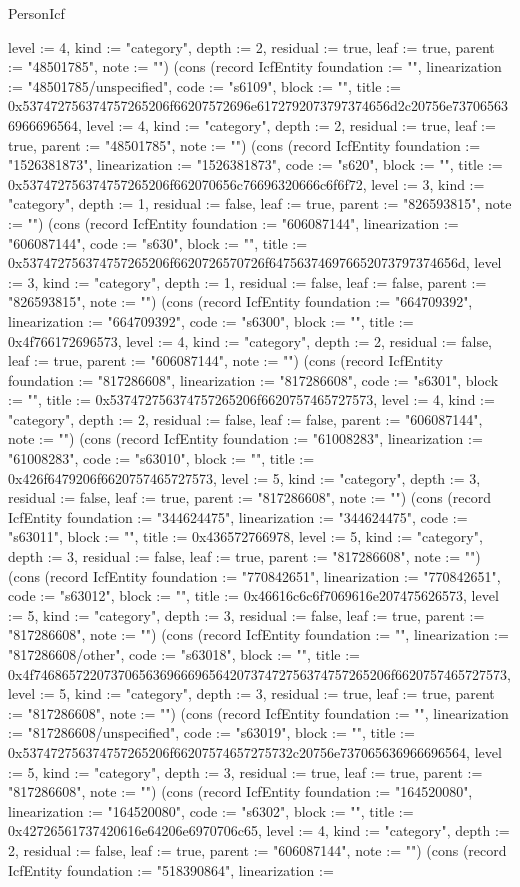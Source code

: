 \begin{lexlean}{PersonIcf}
\begin{semanticmodule}
{level := 4, kind := "category", depth := 2, residual := true, leaf := true, parent := "48501785", note := ""}) (cons (record IcfEntity {foundation := "", linearization := "48501785/unspecified", code := "s6109", block := "", title := 0x537472756374757265206f66207572696e6172792073797374656d2c20756e737065636966696564, level := 4, kind := "category", depth := 2, residual := true, leaf := true, parent := "48501785", note := ""}) (cons (record IcfEntity {foundation := "1526381873", linearization := "1526381873", code := "s620", block := "", title := 0x537472756374757265206f662070656c76696320666c6f6f72, level := 3, kind := "category", depth := 1, residual := false, leaf := true, parent := "826593815", note := ""}) (cons (record IcfEntity {foundation := "606087144", linearization := "606087144", code := "s630", block := "", title := 0x537472756374757265206f6620726570726f647563746976652073797374656d, level := 3, kind := "category", depth := 1, residual := false, leaf := false, parent := "826593815", note := ""}) (cons (record IcfEntity {foundation := "664709392", linearization := "664709392", code := "s6300", block := "", title := 0x4f766172696573, level := 4, kind := "category", depth := 2, residual := false, leaf := true, parent := "606087144", note := ""}) (cons (record IcfEntity {foundation := "817286608", linearization := "817286608", code := "s6301", block := "", title := 0x537472756374757265206f6620757465727573, level := 4, kind := "category", depth := 2, residual := false, leaf := false, parent := "606087144", note := ""}) (cons (record IcfEntity {foundation := "61008283", linearization := "61008283", code := "s63010", block := "", title := 0x426f6479206f6620757465727573, level := 5, kind := "category", depth := 3, residual := false, leaf := true, parent := "817286608", note := ""}) (cons (record IcfEntity {foundation := "344624475", linearization := "344624475", code := "s63011", block := "", title := 0x436572766978, level := 5, kind := "category", depth := 3, residual := false, leaf := true, parent := "817286608", note := ""}) (cons (record IcfEntity {foundation := "770842651", linearization := "770842651", code := "s63012", block := "", title := 0x46616c6c6f7069616e207475626573, level := 5, kind := "category", depth := 3, residual := false, leaf := true, parent := "817286608", note := ""}) (cons (record IcfEntity {foundation := "", linearization := "817286608/other", code := "s63018", block := "", title := 0x4f746865722073706563696669656420737472756374757265206f6620757465727573, level := 5, kind := "category", depth := 3, residual := true, leaf := true, parent := "817286608", note := ""}) (cons (record IcfEntity {foundation := "", linearization := "817286608/unspecified", code := "s63019", block := "", title := 0x537472756374757265206f66207574657275732c20756e737065636966696564, level := 5, kind := "category", depth := 3, residual := true, leaf := true, parent := "817286608", note := ""}) (cons (record IcfEntity {foundation := "164520080", linearization := "164520080", code := "s6302", block := "", title := 0x42726561737420616e64206e6970706c65, level := 4, kind := "category", depth := 2, residual := false, leaf := true, parent := "606087144", note := ""}) (cons (record IcfEntity {foundation := "518390864", linearization := }
\end{semanticmodule}
\end{lexlean}

